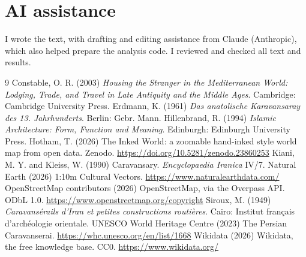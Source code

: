 \documentclass[11pt,a4paper]{article}
\begin{document}
\section*{AI assistance}
I wrote the text, with drafting and editing assistance from Claude (Anthropic), which also helped prepare the analysis code. I reviewed and checked all text and results.


\begin{thebibliography}{9}
 Constable, O. R. (2003) \emph{Housing the Stranger in the Mediterranean World: Lodging, Trade, and Travel in Late Antiquity and the Middle Ages}. Cambridge: Cambridge University Press.
 Erdmann, K. (1961) \emph{Das anatolische Karavansaray des 13. Jahrhunderts}. Berlin: Gebr. Mann.
 Hillenbrand, R. (1994) \emph{Islamic Architecture: Form, Function and Meaning}. Edinburgh: Edinburgh University Press.
 Hotham, T. (2026) The Inked World: a zoomable hand-inked style world map from open data. Zenodo. \url{https://doi.org/10.5281/zenodo.23860253}
 Kiani, M. Y. and Kleiss, W. (1990) Caravansary. \emph{Encyclopaedia Iranica} IV/7.
 Natural Earth (2026) 1:10m Cultural Vectors. \url{https://www.naturalearthdata.com/}
 OpenStreetMap contributors (2026) OpenStreetMap, via the Overpass API. ODbL 1.0. \url{https://www.openstreetmap.org/copyright}
 Siroux, M. (1949) \emph{Caravansérails d'Iran et petites constructions routières}. Cairo: Institut français d'archéologie orientale.
 UNESCO World Heritage Centre (2023) The Persian Caravanserai. \url{https://whc.unesco.org/en/list/1668}
 Wikidata (2026) Wikidata, the free knowledge base. CC0. \url{https://www.wikidata.org/}
\end{thebibliography}
\end{document}

